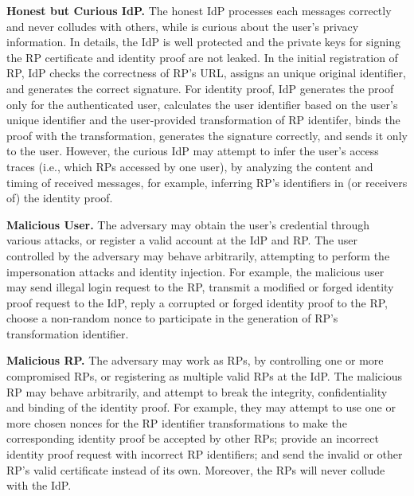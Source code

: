 \textbf{Honest but Curious IdP.}
The honest IdP processes each messages correctly and never colludes with others, while is curious about the user's privacy information.
In details, the IdP is well protected and the private keys for signing the RP certificate and identity proof are not leaked.
In the initial registration of RP,  IdP checks the correctness of RP's URL,  assigns an unique original identifier, and generates the correct signature.
For identity proof, IdP generates the proof only for the authenticated user, calculates the user identifier based on the user's unique identifier
and the user-provided transformation of RP identifer, binds the proof with the transformation, generates the signature correctly,
and sends it only to the user.
However, the curious IdP may attempt to infer the user's access traces (i.e., which RPs accessed by one user),
by analyzing the content and timing of received messages, for example, inferring RP's identifiers in (or receivers of) the identity proof.

\textbf{Malicious User.} %
The adversary may obtain the user's credential through various attacks, or register a valid account at the IdP and RP.
The user controlled by the adversary may behave arbitrarily, attempting to perform the impersonation attacks and identity injection.
For example, the malicious user  may send illegal login request to the RP,
transmit a modified or forged identity proof request to the IdP,
reply a corrupted or forged identity proof to the RP,
 choose a non-random nonce to participate in the generation of RP's transformation identifier.

\textbf{Malicious RP.} %
The adversary may work as RPs, by controlling one or more compromised RPs, or registering as multiple valid RPs at the IdP.
The malicious RP may behave arbitrarily, and attempt to break the integrity, confidentiality and binding of the identity proof.
For example, they may attempt to use one or more chosen nonces for the RP  identifier transformations to make the corresponding identity proof be  accepted by other RPs;
provide an incorrect identity proof request with incorrect RP identifiers;
and send the invalid or other RP's valid certificate instead of its own. Moreover, the RPs will never collude with the IdP.

